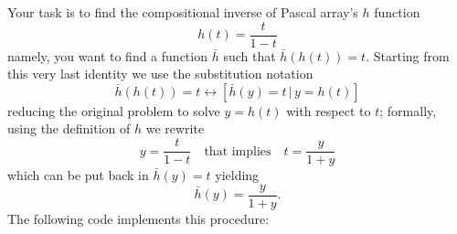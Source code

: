 Your task is to find the compositional inverse of Pascal array's $h$ function
\begin{displaymath}
h(t)= \frac{t}{1-t}
\end{displaymath}
namely, you want to find a function $\bar{h}$ such that $\bar{h}(h(t))=t$.
Starting from this very last identity we use the substitution notation
\begin{displaymath}
\bar{h}(h(t)) = t \leftrightarrow \left[ \bar{h}(y) = t\, | \, y = h(t) \right]
\end{displaymath}
reducing the original problem to solve $y = h(t)$ with respect to $t$;
formally, using the definition of $h$ we rewrite
\begin{displaymath}
y = \frac{t}{1-t} \quad\text{that implies}\quad t = \frac{y}{1+y}
\end{displaymath}
which can be put back in $\bar{h}(y) = t$ yielding
\begin{displaymath}
\bar{h}(y)= \frac{y}{1+y}.
\end{displaymath}
The following code implements this procedure:



